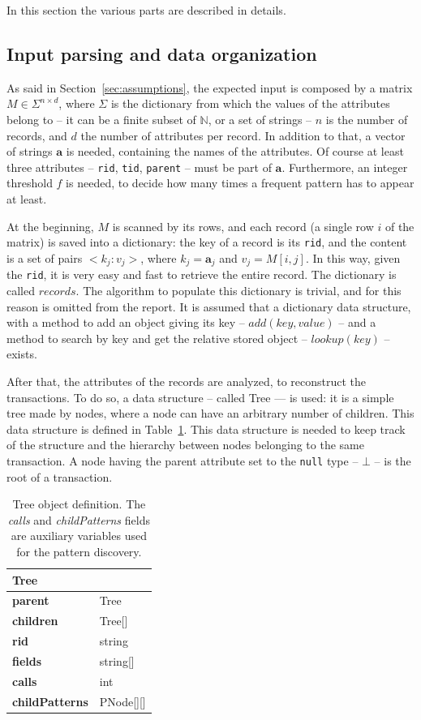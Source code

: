 \documentclass{acm_proc_article-sp-sigmod09}
\begin{document}
In this section the various parts are described in details.

\subsection{Input parsing and data organization}
As said in Section~\ref{sec:assumptions}, the expected input is composed by a matrix $M \in \Sigma^{n \times d}$, where $\Sigma$ is the dictionary from which the values of the attributes belong to -- it can be a finite subset of $\mathbb{N}$, or a set of strings -- $n$ is the number of records, and $d$ the number of attributes per record. In addition to that, a vector of strings $\boldsymbol{a}$ is needed, containing the names of the attributes. Of course at least three attributes -- \texttt{rid}, \texttt{tid}, \texttt{parent} -- must be part of $\boldsymbol{a}$. Furthermore, an integer threshold $f$ is needed, to decide how many times a frequent pattern has to appear at least.

At the beginning, $M$ is scanned by its rows, and each record (a single row $i$ of the matrix) is saved into a dictionary: the key of a record is its \texttt{rid}, and the content is a set of pairs $<k_j \colon v_j>$, where $k_j = \boldsymbol{a}_j$ and $v_j = M[i,j]$. In this way, given the \texttt{rid}, it is very easy and fast to retrieve the entire record. The dictionary is called $records$. The algorithm to populate this dictionary is trivial, and for this reason is omitted from the report. It is assumed that a dictionary data structure, with a method to add an object giving its key -- $add(key, value)$ -- and a method to search by key and get the relative stored object -- $lookup(key)$ -- exists.

After that, the attributes of the records are analyzed, to reconstruct the transactions. To do so, a data structure -- called Tree --- is used: it is a simple tree made by nodes, where a node can have an arbitrary number of children. This data structure is defined in Table~\ref{tab:tree}. This data structure is needed to keep track of the structure and the hierarchy between nodes belonging to the same transaction. A node having the parent attribute set to the \texttt{null} type -- $\bot$ -- is the root of a transaction.

\begin{table}[H]
\centering
\begin{tabular}{|ll|} \hline
\textbf{Tree} & \\ \hline
\textbf{parent} & Tree \\ \hline
\textbf{children} & Tree[] \\ \hline
\textbf{rid} & string \\ \hline
\textbf{fields} & string[] \\ \hline
\textbf{calls} & int \\ \hline
\textbf{childPatterns} & PNode[][] \\
\hline\end{tabular}
\caption{Tree object definition. The \emph{calls} and \emph{childPatterns} fields are auxiliary variables used for the pattern discovery.}
\label{tab:tree}
\end{table}
\end{document}
